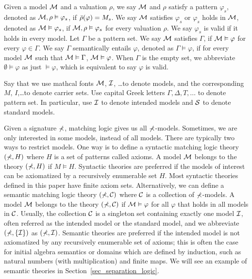 Given a model $\mathcal{M}$ and a valuation $\rho$,
we say $\mathcal{M}$ and $\rho$ satisfy a pattern $\varphi_s$,
denoted as $\mathcal{M},\rho \vDash \varphi_s$,
if $\bar{\rho}(\varphi) = M_s$.
We say $\mathcal{M}$ satisfies $\varphi_s$
or $\varphi_s$ holds in $\mathcal{M}$,
denoted as $\mathcal{M} \vDash \varphi_s$,
if $\mathcal{M} , \rho \vDash \varphi_s$ for every valuation $\rho$.
We say $\varphi_s$ is valid if
it holds in every model.
Let $\Gamma$ be a pattern set.
We say $\mathcal{M}$ satisfies $\Gamma$, if
$\mathcal{M} \vDash \varphi$ for every $\varphi \in \Gamma$.
We say $\Gamma$ semantically entails $\varphi$,
denoted as $\Gamma \vDash \varphi$,
if for every model $\mathcal{M}$ such that $\mathcal{M} \vDash \Gamma$,
$\mathcal{M} \vDash \varphi$.
When $\Gamma$ is the empty set, we abbreviate
$\emptyset \vDash \varphi$ as just $\vDash \varphi$,
which is equivalent to say $\varphi$ is valid.

{
Say that we use mathcal fonts ${\mathcal{M}}$, ${\mathcal{I}}$, \dots to denote models,
and the corresponding $M$, $I$,\dots to denote carrier sets.
Use capital Greek letters $\Gamma, \Delta, T, \dots$ to denote pattern set.
In particular, use $\mathcal{I}$ to denote intended models and
$\mathcal{S}$ to denote standard models.
}

Given a signature $\mathbb{\Sigma}$, matching logic gives us all $\mathbb{\Sigma}$-models.
Sometimes, we are only interested in some models, instead of all models.
There are typically two ways to restrict models.
One way is to define a syntactic matching logic theory
$(\mathbb{\Sigma}, H)$ where $H$ is a set of patterns called axioms.
A model $\mathcal{M}$ belongs to the theory $(\mathbb{\Sigma}, H)$ if $M \vDash H$.
Syntactic theories are preferred if the models of interest can be
axiomatized by a recursively enumerable set $H$.
Most syntactic theories defined in this paper have finite axiom sets.
Alternatively, we can define a semantic matching logic theory
$(\mathbb{\Sigma}, \mathcal{C})$ where $\mathcal{C}$ is a collection of $\mathbb{\Sigma}$-models.
A model $\mathcal{M}$ belongs to the theory $(\mathbb{\Sigma}, \mathcal{C})$ if
$\mathcal{M} \vDash \varphi$ for all $\varphi$ that holds in all models in $\mathcal{C}$.
Usually, the collection $\mathcal{C}$ is a singleton set containing exactly one model 
$\mathcal{I}$,
often referred as the intended model or the standard model,
and we abbreviate $(\mathbb{\Sigma}, \{ \mathcal{I} \})$ as $(\mathbb{\Sigma}, \mathcal{I})$.
Semantic theories are preferred if the intended model is not axiomatized by any
recursively enumerable set of axioms;
this is often the case for 
initial algebra semantics or domains which are defined by induction, such as
natural numbers (with multiplication) and finite maps.
We will see an example of semantic theories in 
Section~\ref{sec_separation_logic}.

